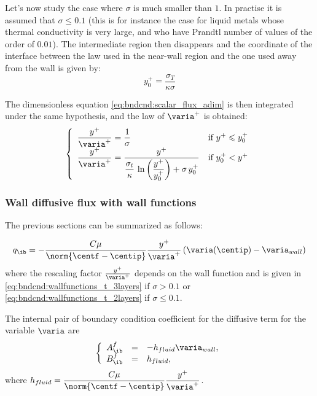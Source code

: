 Let's now study the case where  $\sigma$ is much smaller than $1$.
In practise it is assumed that $\sigma \leqslant 0.1$ (this is for
instance the case for liquid metals whose thermal conductivity is very
large, and who have Prandtl number of values of the order of $0.01$).
The intermediate region then disappears and the coordinate of the
interface between the law used in the near-wall region and the one
used away from the wall is given by:
\begin{equation}
y^+_0= \displaystyle\frac{\sigma_T}{\kappa\sigma}
\end{equation}

The dimensionless equation \eqref{eq:bndcnd:scalar_flux_adim}
is then integrated under the same hypothesis, and the law of
 $\varia^+$ is obtained:
\begin{equation}\label{eq:bndcnd:wallfunctions_t_2layers}
\left\{
\begin{array}{ll}
\dfrac{y^+}{\varia^+} = \dfrac{1}{\sigma} & \text{if } y^+ \leqslant y^+_0 \\
\dfrac{y^+}{\varia^+} = \dfrac{y^+}{\displaystyle\frac{\sigma_t}{\kappa}\,
        \ln\left(\displaystyle\frac{y^+}{y^+_0}\right)+\sigma \,y^+_0}
                   & \text{if } y^+_0 < y^+
\end{array}
\right.
\end{equation}

\subsubsection{Wall diffusive flux with wall functions}
The previous sections can be summarized as follows:

\begin{equation}
q_\ib = -\dfrac{C \mu}{\norm{\centf - \centip} } \dfrac{y^+}{\varia^+} \left(\varia(\centip) - \varia_{wall} \right)
\end{equation}
%
where the rescaling factor $\frac{y^+}{\varia^+}$ depends on the wall function and is given in \eqref{eq:bndcnd:wallfunctions_t_3layers} if $\sigma >0.1$ or \eqref{eq:bndcnd:wallfunctions_t_2layers} if $\sigma \leq 0.1$.

The internal pair of boundary condition coefficient for the diffusive term for the variable $\varia $ are
\begin{equation}
\left\lbrace
\begin{array}{r c l}
A^f_\ib & = & -h_{fluid} \varia_{wall}, \\
B^f_\ib & = & h_{fluid},
\end{array}
\right.
\end{equation}
where $h_{fluid} = \dfrac{C \mu}{\norm{\centf - \centip} } \dfrac{y^+}{\varia^+} $.

